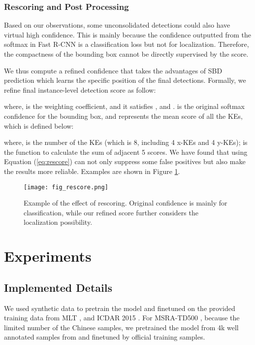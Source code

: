 \documentclass{article}
\begin{document}
\subsubsection{Rescoring and Post Processing}

Based on our observations, some unconsolidated detections could also have virtual high confidence. This is mainly because the confidence outputted from the softmax in Fast R-CNN \cite{girshick2015fast} is a classification loss but not for localization. Therefore, the compactness of the bounding box cannot be directly supervised by the score.

We thus compute a refined confidence that takes the advantages of SBD prediction which learns the specific position of the final detections. Formally, we refine final instance-level detection score as follow:

where,  is the weighting coefficient, and it satisfies , and .  is the original softmax confidence for the bounding box, and  represents the mean score of all the KEs, which is defined below: 

where,  is the number of the KEs (which is 8, including 4 x-KEs and 4 y-KEs);  is the function to calculate the sum of adjacent 5 scores. We have found that using Equation (\ref{eq:rescore}) can not only suppress some false positives but also make the results more reliable. Examples are shown in Figure \ref{fig:rescore}.
\begin{figure}[!t]
  \centering
  \centerline{\texttt{[image: fig\_rescore.png]}}
  \caption{Example of the effect of rescoring. Original confidence is mainly for classification, while our refined score further considers the localization possibility.}\label{fig:rescore}
\end{figure}

\section{Experiments}

\subsection{Implemented Details}
We used synthetic data \cite{Gupta2016Synthetic} to pretrain the model and finetuned on the provided training data from MLT \cite{nayef2017icdar2017}, and ICDAR 2015 \cite{karatzas2015icdar}. For MSRA-TD500 \cite{Yao2012Detecting}, because the limited number of the Chinese samples, we pretrained the model from 4k well annotated samples from \cite{Shi2017ICDAR2017} and finetuned by official training samples. 
\end{document}
